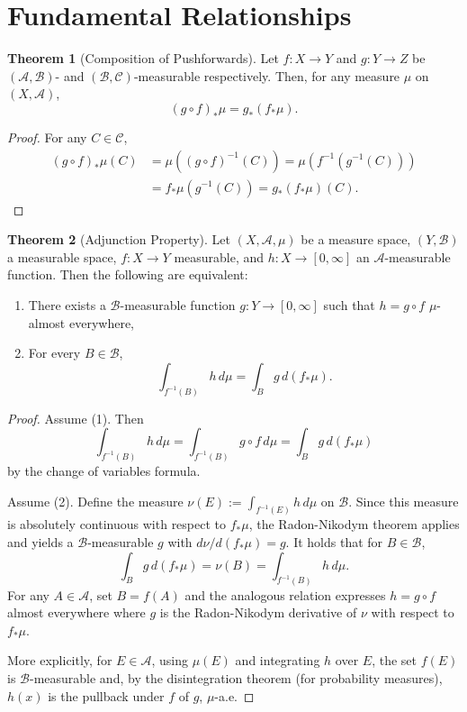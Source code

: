 \documentclass[12pt]{article}
\theoremstyle{definition}
\newtheorem{theorem}{Theorem}[section]
\begin{document}
\section{Fundamental Relationships}

\begin{theorem}[Composition of Pushforwards]
Let $f: X \to Y$ and $g: Y \to Z$ be $(\mathscr{A}, \mathscr{B})$- and $(\mathscr{B}, \mathscr{C})$-measurable respectively. Then, for any measure $\mu$ on $(X, \mathscr{A})$,
\[
(g \circ f)_{*}\mu = g_{*}(f_{*}\mu).
\]
\end{theorem}

\begin{proof}
For any $C \in \mathscr{C}$,
\begin{align*}
(g \circ f)_{*}\mu(C) &= \mu( (g \circ f)^{-1}(C) ) = \mu( f^{-1}( g^{-1}(C) ) ) \\
&= f_{*}\mu( g^{-1}(C) ) = g_{*}( f_{*}\mu )(C).
\end{align*}
\end{proof}

\begin{theorem}[Adjunction Property]
Let $(X, \mathscr{A}, \mu)$ be a measure space, $(Y, \mathscr{B})$ a measurable space, $f: X \to Y$ measurable, and $h: X \to [0,\infty]$ an $\mathscr{A}$-measurable function. Then the following are equivalent:
\begin{enumerate}
    \item There exists a $\mathscr{B}$-measurable function $g: Y \to [0,\infty]$ such that $h = g \circ f$ $\mu$-almost everywhere,
    \item For every $B \in \mathscr{B}$,
    \[
    \int_{f^{-1}(B)} h \, d\mu = \int_{B} g \, d(f_{*}\mu).
    \]
\end{enumerate}
\end{theorem}

\begin{proof}
Assume (1). Then
\[
\int_{f^{-1}(B)} h \, d\mu = \int_{f^{-1}(B)} g \circ f \, d\mu = \int_{B} g \, d(f_{*}\mu)
\]
by the change of variables formula.

Assume (2). Define the measure $\nu(E) := \int_{f^{-1}(E)} h \, d\mu$ on $\mathscr{B}$. Since this measure is absolutely continuous with respect to $f_{*}\mu$, the Radon-Nikodym theorem applies and yields a $\mathscr{B}$-measurable $g$ with $d\nu/d(f_{*}\mu) = g$.
It holds that for $B \in \mathscr{B}$,
\[
\int_{B} g \, d(f_{*}\mu) = \nu(B) = \int_{f^{-1}(B)} h \, d\mu.
\]
For any $A \in \mathscr{A}$, set $B = f(A)$ and the analogous relation expresses $h = g \circ f$ almost everywhere where $g$ is the Radon-Nikodym derivative of $\nu$ with respect to $f_{*}\mu$. 

More explicitly, for $E \in \mathscr{A}$, using $\mu(E)$ and integrating $h$ over $E$, the set $f(E)$ is $\mathscr{B}$-measurable and, by the disintegration theorem (for probability measures), $h(x)$ is the pullback under $f$ of $g$, $\mu$-a.e.
\end{proof}
\end{document}

